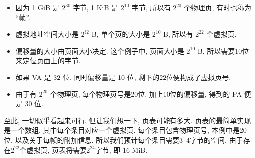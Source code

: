 \documentclass[12pt]{book}
\begin{document}
{\begin{itemize}
%
%
%
%
\item 因为 1 GiB 是 $2^{30}$ 字节, 1 KiB 是 $2^{10}$ 字节, 
  所以有 $2^{20}$ 个物理页, 有时也称为 ``帧''.

\item 虚拟地址空间大小是 $2^{32}$ B, 单个页的大小是 $2^{10}$ B, 
  所以有 $2^{22}$ 个虚拟页.

\item 偏移量的大小由页面大小决定.  这个例子中, 页面大小是 $2^{10}$ B, 
  所以需要10位来定位页面上的字节.

\item 如果 VA 是 32 位, 同时偏移量是 10 位, 剩下的22位便构成了虚拟页号.

\item 由于有 $2^{20}$ 个物理页, 每个物理页号是20位. 
  加上10位的偏移量, 得到的 PA 便是 30 位.

\end{itemize}
%
至此, 一切似乎看起来可行. 但让我们想一下, 页表可能有多大.
页表的最简单实现是一个数组, 其中每个条目对应一个虚拟页.
每个条目包含物理页号, 本例中是20位, 以及关于每帧的附加信息.
所以我们预计每个条目需要3--4字节的空间.
由于存在$2^{22}$个虚拟页, 
页表将需要$2^{24}$字节, 即 16 MiB.

}
\end{document}

